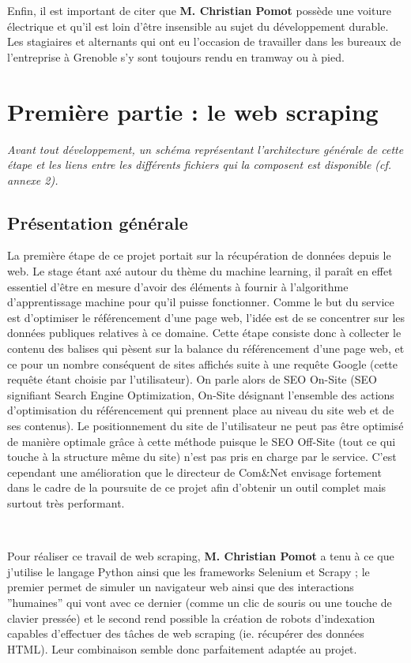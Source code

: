 \documentclass[12pt]{article}
\begin{document}
Enfin, il est important de citer que \textbf{M. Christian Pomot} possède une voiture électrique et qu'il est loin d'être insensible au sujet du développement durable. Les stagiaires et alternants qui ont eu l'occasion de travailler dans les bureaux de l'entreprise à Grenoble s'y sont toujours rendu en tramway ou à pied.


\newpage
\section{Première partie : le web scraping}

\textit{Avant tout développement, un schéma représentant l'architecture générale de cette étape et les liens entre les différents fichiers qui la composent est disponible (cf. \textsl{annexe 2}).}

\subsection{Présentation générale}

La première étape de ce projet portait sur la récupération de données depuis le web. Le stage étant axé autour du thème du machine learning, il paraît en effet essentiel d'être en mesure d'avoir des éléments à fournir à l'algorithme d'apprentissage machine pour qu'il puisse fonctionner. Comme le but du service est d'optimiser le référencement d'une page web, l'idée est de se concentrer sur les données publiques relatives à ce domaine. Cette étape consiste donc à collecter le contenu des balises qui pèsent sur la balance du référencement d'une page web, et ce pour un nombre conséquent de sites affichés suite à une requête Google (cette requête étant choisie par l'utilisateur). On parle alors de SEO On-Site (SEO signifiant Search Engine Optimization, On-Site désignant l’ensemble des actions d’optimisation du référencement qui prennent place au niveau du site web et de ses contenus). Le positionnement du site de l'utilisateur ne peut pas être optimisé de manière optimale grâce à cette méthode puisque le SEO Off-Site (tout ce qui touche à la structure même du site) n'est pas pris en charge par le service. C'est cependant une amélioration que le directeur de Com\&Net envisage fortement dans le cadre de la poursuite de ce projet afin d'obtenir un outil complet mais surtout très performant.

\

Pour réaliser ce travail de web scraping, \textbf{M. Christian Pomot} a tenu à ce que j'utilise le langage \textsf{Python} ainsi que les frameworks \textsf{Selenium} et \textsf{Scrapy} ; le premier permet de simuler un navigateur web ainsi que des interactions ''humaines'' qui vont avec ce dernier (comme un clic de souris ou une touche de clavier pressée) et le second rend possible la création de robots d'indexation capables d'effectuer des tâches de web scraping (ie. récupérer des données \textsf{HTML}). Leur combinaison semble donc parfaitement adaptée au projet.
\end{document}
